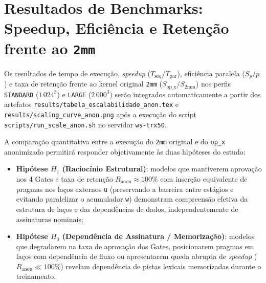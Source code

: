 \section{Resultados de Benchmarks: Speedup, Eficiência e Retenção frente ao \texttt{2mm}}
\label{sec:anon_benchmarks}

Os resultados de tempo de execução, \textit{speedup} ($T_{\text{seq}}/T_{\text{par}}$), eficiência paralela ($S_p / p$) e taxa de retenção frente ao kernel original \texttt{2mm} ($S_{\text{op\_x}} / S_{\text{2mm}}$) nos perfis \texttt{STANDARD} ($1\,024^3$) e \texttt{LARGE} ($2\,000^3$) serão integrados automaticamente a partir dos artefatos \texttt{results/tabela\_escalabilidade\_anon.tex} e \texttt{results/scaling\_curve\_anon.png} após a execução do script \texttt{scripts/run\_scale\_anon.sh} no servidor \texttt{ws-trx50}.

A comparação quantitativa entre a execução do \texttt{2mm} original e do \texttt{op\_x} anonimizado permitirá responder objetivamente às duas hipóteses do estudo:
\begin{itemize}
    \item \textbf{Hipótese $H_1$ (Raciocínio Estrutural)}: modelos que mantiverem aprovação nos 4 Gates e taxa de retenção $R_{\text{anon}} \approx 100\%$ com inserção equivalente de pragmas nos laços externos \texttt{u} (preservando a barreira entre estágios e evitando paralelizar o acumulador \texttt{w}) demonstram compreensão efetiva da estrutura de laços e das dependências de dados, independentemente de assinaturas nominais;
    \item \textbf{Hipótese $H_0$ (Dependência de Assinatura / Memorização)}: modelos que degradarem na taxa de aprovação dos Gates, posicionarem pragmas em laços com dependência de fluxo ou apresentarem queda abrupta de \textit{speedup} ($R_{\text{anon}} \ll 100\%$) revelam dependência de pistas lexicais memorizadas durante o treinamento.
\end{itemize}
